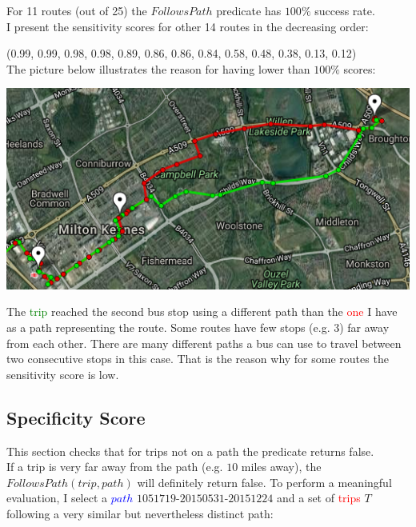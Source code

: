 \documentclass[12pt,a4paper,oneside,openright]{report}
\begin{document}
For 11 routes (out of 25) the $FollowsPath$ predicate has $100\%$ success rate. \\

I present the sensitivity scores for other 14 routes in the decreasing order:

(0.99, 0.99, 0.98, 0.98, 0.89, 0.86, 0.86, 0.84, 0.58, 0.48, 0.38, 0.13, 0.12) \\

The picture below illustrates the reason for having lower than $100\%$ scores:

\includegraphics[width=\textwidth]{figs/same_route_wrong_path.png}

The \textcolor{green}{trip} reached the second bus stop using a different path
than the \textcolor{red}{one} I have as a path representing the route.
Some routes have few stops (e.g. 3) far away from each other.
There are many different paths a bus can use to travel
between two consecutive stops in this case. That is the reason why for some routes the
sensitivity score is low.

\subsection{Specificity Score}

This section checks that for trips not on a path the predicate returns false. \\

If a trip is very far away from the path (e.g. $10$ miles away), the
$FollowsPath(trip, path)$ will definitely return false. To perform
a meaningful evaluation, I select a \textcolor{blue}{$path$}
$1051719$-$20150531$-$20151224$ and a set of \textcolor{red}{trips}
$T$ following a very similar but nevertheless distinct path: \\
\end{document}

